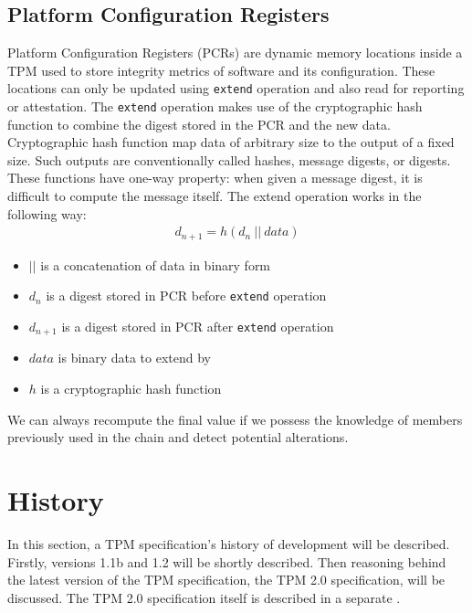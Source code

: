 \subsection{Platform Configuration Registers}\label{sec:pcr}
Platform Configuration Registers (PCRs) are dynamic memory locations inside a TPM used to store integrity metrics of software and its configuration. These locations can only be updated using \texttt{extend} operation and also read for reporting or attestation. The \texttt{extend} operation makes use of the cryptographic hash function to combine the digest stored in the PCR and the new data. Cryptographic hash function map data of arbitrary size to the output of a fixed size. Such outputs are conventionally called hashes, message digests, or digests. These functions have one-way property: when given a message digest, it is difficult  to compute the message itself. The extend operation works in the following way:
\begin{align*}
    d_{n+1} = h(d_{n}\ ||\ data)
\end{align*}
\begin{itemize}
    \item $||$ is a concatenation of data in binary form
    \item $ d_{n} $ is a digest stored in PCR before \texttt{extend} operation
    \item $ d_{n+1} $ is a digest stored in PCR after \texttt{extend} operation
    \item $ data $ is binary data to extend by
    \item $ h $ is a cryptographic hash function
\end{itemize}

We can always recompute the final value if we possess the knowledge of members previously used in the chain and detect potential alterations.



\section{History}
In this section, a TPM specification's history of development will be described. Firstly, versions 1.1b and 1.2 will be shortly described. Then reasoning behind the latest version of the TPM specification, the TPM 2.0 specification, will be discussed. The TPM 2.0 specification itself is described in a separate .

